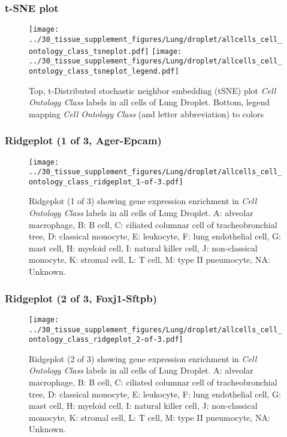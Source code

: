 \clearpage
\subsubsection{t-SNE plot}
\begin{figure}[h]
\centering
\texttt{[image: ../30\_tissue\_supplement\_figures/Lung/droplet/allcells\_cell\_ontology\_class\_tsneplot.pdf]}
\texttt{[image: ../30\_tissue\_supplement\_figures/Lung/droplet/allcells\_cell\_ontology\_class\_tsneplot\_legend.pdf]}
\caption{Top, t-Distributed stochastic neighbor embedding (tSNE) plot  \emph{Cell Ontology Class} labels in all cells of Lung Droplet. Bottom, legend mapping \emph{Cell Ontology Class} (and letter abbreviation) to colors}
\end{figure}


\clearpage

\subsubsection{Ridgeplot (1 of 3, Ager-Epcam)}
\begin{figure}[h]
\centering
\texttt{[image: ../30\_tissue\_supplement\_figures/Lung/droplet/allcells\_cell\_ontology\_class\_ridgeplot\_1-of-3.pdf]}

\caption{ Ridgeplot (1 of 3)  showing gene expression enrichment in \emph{Cell Ontology Class} labels in all cells of Lung Droplet. A: alveolar macrophage, B: B cell, C: ciliated columnar cell of tracheobronchial tree, D: classical monocyte, E: leukocyte, F: lung endothelial cell, G: mast cell, H: myeloid cell, I: natural killer cell, J: non-classical monocyte, K: stromal cell, L: T cell, M: type II pneumocyte, NA: Unknown.}
\end{figure}


\clearpage

\subsubsection{Ridgeplot (2 of 3, Foxj1-Sftpb)}
\begin{figure}[h]
\centering
\texttt{[image: ../30\_tissue\_supplement\_figures/Lung/droplet/allcells\_cell\_ontology\_class\_ridgeplot\_2-of-3.pdf]}

\caption{ Ridgeplot (2 of 3)  showing gene expression enrichment in \emph{Cell Ontology Class} labels in all cells of Lung Droplet. A: alveolar macrophage, B: B cell, C: ciliated columnar cell of tracheobronchial tree, D: classical monocyte, E: leukocyte, F: lung endothelial cell, G: mast cell, H: myeloid cell, I: natural killer cell, J: non-classical monocyte, K: stromal cell, L: T cell, M: type II pneumocyte, NA: Unknown.}
\end{figure}


